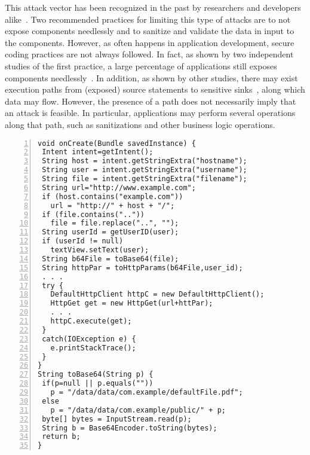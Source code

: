This attack vector has been recognized in the past by researchers and developers alike~\cite{Lu:CHEX:2012,chin2011analyzing,AppIntent,IntentsForDevelopers}. Two recommended practices for limiting this type of attacks are to not expose components needlessly and to sanitize and validate the data in input to the components. However, as often happens in application development, secure coding practices are not always followed. In fact, as shown by two independent studies of the first practice, a large percentage of applications still exposes components needlessly~\cite{Epicc,chin2011analyzing}. In addition, as shown by other studies, there may exist execution paths from (exposed) source statements to sensitive sinks~\cite{Lu:CHEX:2012}, along which data may flow. However, the presence of a path does not necessarily imply that an attack is feasible. In particular, applications may perform several operations along that path, such as sanitizations and other business logic operations. 

\begin{lstlisting}[caption={Source code of a vulnerable application},label={lst:example},numbers=left,xleftmargin=1cm,basicstyle=\ttfamily\scriptsize ]
void onCreate(Bundle savedInstance) {
 Intent intent=getIntent();
 String host = intent.getStringExtra("hostname");
 String user = intent.getStringExtra("username");
 String file = intent.getStringExtra("filename");
 String url="http://www.example.com";
 if (host.contains("example.com"))
   url = "http://" + host + "/";
 if (file.contains(".."))
   file = file.replace("..", "");
 String userId = getUserID(user);
 if (userId != null)
   textView.setText(user);
 String b64File = toBase64(file);
 String httpPar = toHttpParams(b64File,user_id);
 . . .
 try {
   DefaultHttpClient httpC = new DefaultHttpClient();
   HttpGet get = new HttpGet(url+httPar);
   . . .
   httpC.execute(get);
 }
 catch(IOException e) {
   e.printStackTrace();
 }
}
String toBase64(String p) {
 if(p=null || p.equals(""))
   p = "/data/data/com.example/defaultFile.pdf";
 else
   p = "/data/data/com.example/public/" + p;
 byte[] bytes = InputStream.read(p);
 String b = Base64Encoder.toString(bytes);
 return b;
}
\end{lstlisting}

